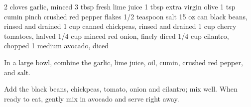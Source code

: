 \documentclass{xcookybooky}
\begin{document}
    2 cloves garlic, minced
    3 tbsp fresh lime juice
    1 tbsp extra virgin olive
    1 tsp cumin
    pinch crushed red pepper flakes
    1/2 teaspoon salt
    15 oz can black beans, rinsed and drained
    1 cup canned chickpeas, rinsed and drained
    1 cup cherry tomatoes, halved
    1/4 cup minced red onion, finely diced
    1/4 cup cilantro, chopped
    1 medium avocado, diced

In a large bowl, combine the garlic, lime juice, oil, cumin, crushed red pepper, and salt.

Add the black beans, chickpeas, tomato, onion and cilantro; mix well. When ready to eat, gently mix in avocado and serve right away.
\end{document}
